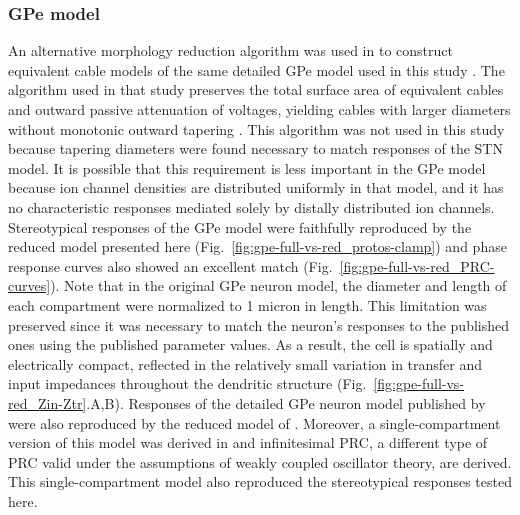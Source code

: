 \subsubsection{GPe model}
An alternative morphology reduction algorithm was used in \cite{hendrickson_capabilities_2011}
to construct equivalent cable models of the same detailed GPe model used in
this study \cite{gunay_channel_2008}. The algorithm used in that study preserves the total
surface area of equivalent cables and outward passive attenuation of voltages,
yielding cables with larger diameters without monotonic outward tapering \cite{destexhe_simplified_2001,tobin_creation_2006}. This algorithm was not
used in this study because tapering diameters were found necessary to match responses
of the STN model. It is possible that this requirement is less important in the
GPe model because ion channel densities are distributed uniformly in that model,
and it has no characteristic responses mediated solely by distally distributed
ion channels.
%
Stereotypical responses of the GPe model were faithfully reproduced by the
reduced model presented here (Fig.~\ref{fig:gpe-full-vs-red_protos-clamp})
and phase response curves also showed an excellent match (Fig.~\ref{fig:gpe-full-vs-red_PRC-curves}).
Note that in the original \cite{gunay_channel_2008} GPe neuron model, the diameter and length of each
compartment were normalized to 1 micron in length. This limitation
was preserved since it was necessary to match the neuron's responses
to the published ones using the published parameter values.
As a result, the cell is spatially and electrically compact, reflected in
the relatively small variation in transfer and input impedances throughout the
dendritic structure (Fig.~\ref{fig:gpe-full-vs-red_Zin-Ztr}.A,B).
%
Responses of the detailed GPe neuron model published by \cite{gunay_channel_2008}
were also reproduced by the reduced model of \cite{hendrickson_capabilities_2011}.
Moreover, a single-compartment version of this model was derived in \cite{fujita_influences_2012}
and infinitesimal PRC, a different type of PRC valid under the assumptions of weakly coupled oscillator
theory, are derived. This single-compartment model also reproduced the stereotypical
responses tested here.
%

%
%

